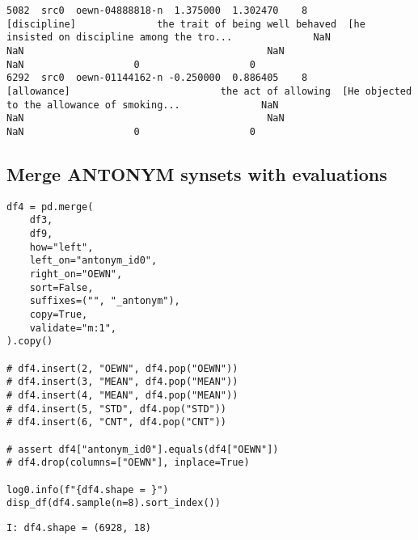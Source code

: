 \documentclass[a4paper,10pt,onecolumn,oneside,openright]{article}
\begin{document}
\begin{verbatim}
5082  src0  oewn-04888818-n  1.375000  1.302470    8                   [discipline]              the trait of being well behaved  [he insisted on discipline among the tro...              NaN                            NaN                                          NaN                                          NaN                   0                   0
6292  src0  oewn-01144162-n -0.250000  0.886405    8                    [allowance]                          the act of allowing  [He objected to the allowance of smoking...              NaN                            NaN                                          NaN                                          NaN                   0                   0
\end{verbatim}

\subsection{Merge ANTONYM synsets with evaluations}
\label{sec:org435c36c}
\begin{verbatim}
df4 = pd.merge(
    df3,
    df9,
    how="left",
    left_on="antonym_id0",
    right_on="OEWN",
    sort=False,
    suffixes=("", "_antonym"),
    copy=True,
    validate="m:1",
).copy()

# df4.insert(2, "OEWN", df4.pop("OEWN"))
# df4.insert(3, "MEAN", df4.pop("MEAN"))
# df4.insert(4, "MEAN", df4.pop("MEAN"))
# df4.insert(5, "STD", df4.pop("STD"))
# df4.insert(6, "CNT", df4.pop("CNT"))

# assert df4["antonym_id0"].equals(df4["OEWN"])
# df4.drop(columns=["OEWN"], inplace=True)

log0.info(f"{df4.shape = }")
disp_df(df4.sample(n=8).sort_index())
\end{verbatim}

\begin{verbatim}
I: df4.shape = (6928, 18)
\end{verbatim}
\end{document}
